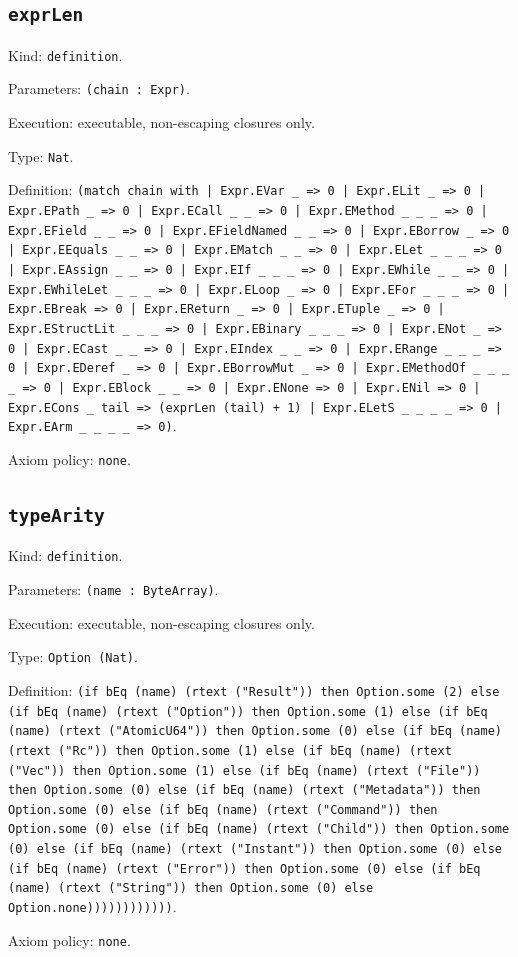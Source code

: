 \documentclass[11pt]{article}
\begin{document}
\subsection*{\texttt{exprLen}}
\noindent Kind: \texttt{definition}.\par
\noindent Parameters: \texttt{(chain : Expr)}.\par
\noindent Execution: executable, non-escaping closures only.\par
\noindent Type: \texttt{Nat}.\par
\noindent Definition: \texttt{(match chain with | Expr.EVar \_ => 0 | Expr.ELit \_ => 0 | Expr.EPath \_ => 0 | Expr.ECall \_ \_ => 0 | Expr.EMethod \_ \_ \_ => 0 | Expr.EField \_ \_ => 0 | Expr.EFieldNamed \_ \_ => 0 | Expr.EBorrow \_ => 0 | Expr.EEquals \_ \_ => 0 | Expr.EMatch \_ \_ => 0 | Expr.ELet \_ \_ \_ => 0 | Expr.EAssign \_ \_ => 0 | Expr.EIf \_ \_ \_ => 0 | Expr.EWhile \_ \_ => 0 | Expr.EWhileLet \_ \_ \_ => 0 | Expr.ELoop \_ => 0 | Expr.EFor \_ \_ \_ => 0 | Expr.EBreak => 0 | Expr.EReturn \_ => 0 | Expr.ETuple \_ => 0 | Expr.EStructLit \_ \_ \_ => 0 | Expr.EBinary \_ \_ \_ => 0 | Expr.ENot \_ => 0 | Expr.ECast \_ \_ => 0 | Expr.EIndex \_ \_ => 0 | Expr.ERange \_ \_ \_ => 0 | Expr.EDeref \_ => 0 | Expr.EBorrowMut \_ => 0 | Expr.EMethodOf \_ \_ \_ \_ => 0 | Expr.EBlock \_ \_ => 0 | Expr.ENone => 0 | Expr.ENil => 0 | Expr.ECons \_ tail => (exprLen (tail) + 1) | Expr.ELetS \_ \_ \_ \_ => 0 | Expr.EArm \_ \_ \_ \_ => 0)}.\par
\noindent Axiom policy: \texttt{none}.\par
\subsection*{\texttt{typeArity}}
\noindent Kind: \texttt{definition}.\par
\noindent Parameters: \texttt{(name : ByteArray)}.\par
\noindent Execution: executable, non-escaping closures only.\par
\noindent Type: \texttt{Option (Nat)}.\par
\noindent Definition: \texttt{(if bEq (name) (rtext ("Result")) then Option.some (2) else (if bEq (name) (rtext ("Option")) then Option.some (1) else (if bEq (name) (rtext ("AtomicU64")) then Option.some (0) else (if bEq (name) (rtext ("Rc")) then Option.some (1) else (if bEq (name) (rtext ("Vec")) then Option.some (1) else (if bEq (name) (rtext ("File")) then Option.some (0) else (if bEq (name) (rtext ("Metadata")) then Option.some (0) else (if bEq (name) (rtext ("Command")) then Option.some (0) else (if bEq (name) (rtext ("Child")) then Option.some (0) else (if bEq (name) (rtext ("Instant")) then Option.some (0) else (if bEq (name) (rtext ("Error")) then Option.some (0) else (if bEq (name) (rtext ("String")) then Option.some (0) else Option.none))))))))))))}.\par
\noindent Axiom policy: \texttt{none}.\par
\end{document}
